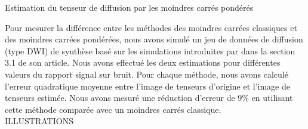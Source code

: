 \begin{center}
    \begin{minipage}[c]{0.9\textwidth}
	\begin{algorithm}[H]
	    \vspace*{0.5em}
	    \vspace*{1em}		
	    \vspace*{0.5em}
	    \caption{\label{algo:estimation_tenseur_2}Estimation du tenseur de diffusion par les moindres carrés pondérés}
	\end{algorithm}
    \end{minipage}
\end{center}

Pour mesurer la différence entre les méthodes des moindres carrées classiques et des moindres carrées pondérées, 
nous avons simulé un jeu de données de diffusion (type DWI) de synthèse basé sur les simulations introduites par \cite{Zhu2007} dans la section 3.1 de son article.
Nous avons effectué les deux estimations pour différentes valeurs du rapport signal sur bruit.
Pour chaque méthode, nous avons calculé l'erreur quadratique moyenne entre l'image de tenseurs d'origine et l'image de tenseurs estimée.
Nous avons mesuré une réduction d'erreur de 9\% en utilisant cette méthode comparée avec un moindres carrés classique.\\
{\color{red}ILLUSTRATIONS}


